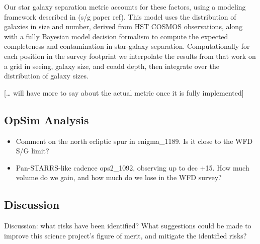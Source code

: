Our star galaxy separation metric accounts for these factors, using a modeling
framework described in (s/g paper ref). This model uses the distribution of
galaxies in size and number, derived from HST COSMOS observations, along with
a fully Bayesian model decision formalism to compute the expected completeness
and contamination in star-galaxy separation. Computationally for each position
in the survey footprint we interpolate the results from that work on a grid in
seeing, galaxy size, and coadd depth, then integrate over the distribution of
galaxy sizes.

[… will have more to say about the actual metric once it is fully implemented]



\subsection{OpSim Analysis}
\label{sec:keyword:MW_Halo_analysis}

\begin{itemize}

\item Comment on the north ecliptic spur in enigma\_1189. Is it close to the
WFD S/G limit?

\item Pan-STARRS-like cadence ops2\_1092, observing up to dec +15. How much
volume do we gain, and how much do we lose in the WFD survey?

\end{itemize}



\subsection{Discussion}
\label{sec:keyword:MW_Halo_discussion}

Discussion: what risks have been identified? What suggestions could be
made to improve this science project's figure of merit, and mitigate
the identified risks?



\navigationbar
